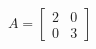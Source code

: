 \documentclass{article}
\begin{document}
\begin{align*}
A = \begin{bmatrix} 2 & 0 \\ 0 & 3 \end{bmatrix}
\end{align*}
\end{document}
